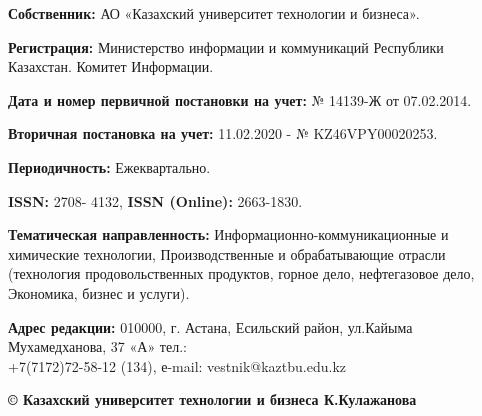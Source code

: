 {\textbf{Собственник:} АО «Казахский университет технологии и бизнеса».

\textbf{Регистрация:} Министерство информации и коммуникаций Республики
Казахстан. Комитет Информации.

\textbf{Дата и номер первичной постановки на учет:} № 14139-Ж от 07.02.2014.

\textbf{Вторичная постановка на учет:} 11.02.2020 - № KZ46VPY00020253.

\textbf{Периодичность:} Ежеквартально.

\textbf{ISSN:} 2708- 4132, \textbf{ISSN (Online):} 2663-1830.

\textbf{Тематическая направленность:} Информационно-коммуникационные и
химические технологии, Производственные и обрабатывающие отрасли (технология
продовольственных продуктов, горное дело, нефтегазовое дело, Экономика, бизнес и
услуги).

\textbf{Адрес редакции:} 010000, г. Астана, Есильский район, ул.Кайыма
Мухамедханова, 37 «А» тел.: \\+7(7172)72-58-12 (134), е-mail: vestnik@kaztbu.edu.kz
\vfill
\begin{center}
\textbf{\normalsize © Казахский университет технологии и бизнеса К.Кулажанова}
\end{center}
}
\pagebreak
